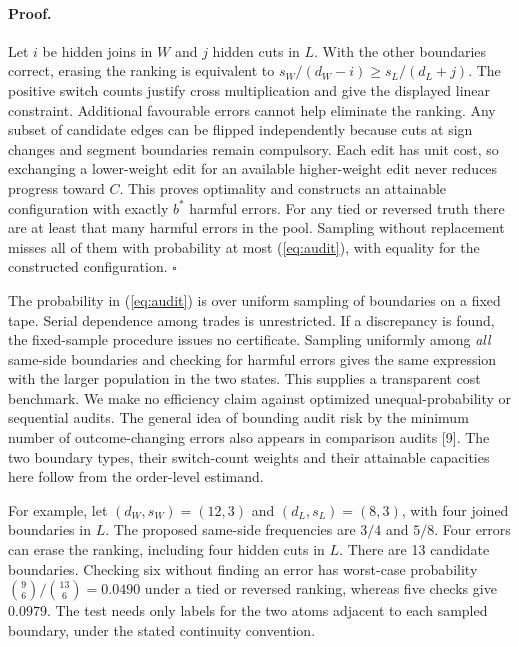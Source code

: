 \paragraph{Proof.}
Let $i$ be hidden joins in $W$ and $j$ hidden cuts in $L$. With the other boundaries correct, erasing the ranking is equivalent to $s_W/(d_W-i)\geq s_L/(d_L+j)$. The positive switch counts justify cross multiplication and give the displayed linear constraint. Additional favourable errors cannot help eliminate the ranking. Any subset of candidate edges can be flipped independently because cuts at sign changes and segment boundaries remain compulsory. Each edit has unit cost, so exchanging a lower-weight edit for an available higher-weight edit never reduces progress toward $C$. This proves optimality and constructs an attainable configuration with exactly $b^*$ harmful errors. For any tied or reversed truth there are at least that many harmful errors in the pool. Sampling without replacement misses all of them with probability at most (\ref{eq:audit}), with equality for the constructed configuration. \hfill$\square$

The probability in (\ref{eq:audit}) is over uniform sampling of boundaries on a fixed tape. Serial dependence among trades is unrestricted. If a discrepancy is found, the fixed-sample procedure issues no certificate. Sampling uniformly among \emph{all} same-side boundaries and checking for harmful errors gives the same expression with the larger population in the two states. This supplies a transparent cost benchmark. We make no efficiency claim against optimized unequal-probability or sequential audits. The general idea of bounding audit risk by the minimum number of outcome-changing errors also appears in comparison audits [9]. The two boundary types, their switch-count weights and their attainable capacities here follow from the order-level estimand.

For example, let $(d_W,s_W)=(12,3)$ and $(d_L,s_L)=(8,3)$, with four joined boundaries in $L$. The proposed same-side frequencies are $3/4$ and $5/8$. Four errors can erase the ranking, including four hidden cuts in $L$. There are 13 candidate boundaries. Checking six without finding an error has worst-case probability $\binom{9}{6}/\binom{13}{6}=0.0490$ under a tied or reversed ranking, whereas five checks give $0.0979$. The test needs only labels for the two atoms adjacent to each sampled boundary, under the stated continuity convention.
